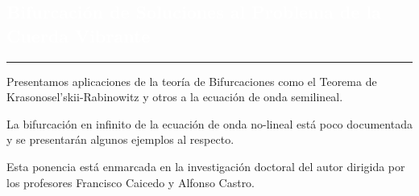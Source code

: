 \begin{titlepage}
\pagecolor{white}
\BgThispage
{}
\vspace*{-1.1cm}
\noindent
\def\titulo#1{\section{#1}}
\section{\bf\large\textcolor{white}{Bifurcaci\'on de Soluciones al Problema de la Cuerda Vibrante}}

\vspace*{2cm}\par
\noindent

\begin{minipage}{0.5\linewidth}
\begin{minipage}{0.45\linewidth}
    \begin{flushright}
        \printauthor
    \end{flushright}
\end{minipage} \hspace{0pt}
%
\begin{minipage}{0.02\linewidth}
      \color{ptctitle} \rule{1pt}{175pt}
\end{minipage} 
\end{minipage}
\hspace*{-4.5cm}
%
\begin{minipage}{0.85\linewidth}
\begin{minipage}{0.85\linewidth}
\footnotesize
\vspace{5pt}
    \begin{resumen}
Presentamos aplicaciones de la teor\'ia de Bifurcaciones como el Teorema de
Krasonosel'skii-Rabinowitz \cite{Bro04} y otros \cite{Dem85} a la ecuaci\'on de onda semilineal.

La bifurcaci\'on en infinito de la ecuaci\'on de onda no-lineal est\'a poco documentada y se presentar\'an
algunos ejemplos al respecto.

Esta ponencia est\'a enmarcada en la investigaci\'on doctoral del autor dirigida por los
profesores Francisco Caicedo y Alfonso Castro.

    \end{resumen}
   \end{minipage}
\end{minipage}
\vspace{5pt}
\begin{thebibliography}{99}


\end{thebibliography}
\end{titlepage}
